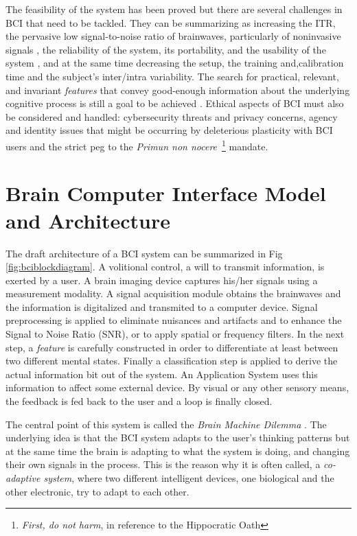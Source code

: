 The feasibility of the system has been proved but there are several challenges in BCI that need to be tackled. They can be summarizing as 
increasing the ITR, the pervasive low signal-to-noise ratio of brainwaves, particularly of noninvasive signals \cite{Lotte2018}, the reliability of the system, its portability, and the usability of the system \cite{Wang2018}, and at the same time decreasing the setup, the training and,calibration time and the subject's inter/intra variability. The search for practical, relevant, and invariant \textit{features} that convey good-enough information about the underlying cognitive process is still a goal to be achieved \cite{Perdikis2014}.  Ethical aspects of BCI \cite{Yuste2017} must also be considered and handled: cybersecurity threats and privacy concerns,  agency and identity issues that might be occurring by deleterious plasticity with BCI users and the strict peg to the \textit{Primun non nocere}~\footnote{\textit{First, do not harm}, in reference to the Hippocratic Oath} mandate.


\section{Brain Computer Interface Model and Architecture}

The draft architecture of a BCI system can be summarized in Fig \ref{fig:bciblockdiagram}.  A volitional control, a will to transmit information, is exerted by a user. A brain imaging device captures his/her signals using a measurement modality.  A signal acquisition module obtains the brainwaves and the information is digitalized and transmited to a computer device.  Signal preprocessing is applied to eliminate nuisances and artifacts and to enhance the Signal to Noise Ratio (SNR), or to apply spatial or frequency filters.  In the next step, a \textit{feature} is carefully constructed in order to differentiate at least between two different mental states.  Finally a classification step is applied to derive the actual information bit out of the system.   An Application System uses this information to affect some external device.  By visual or any other sensory means, the feedback is fed back to the user and a loop is finally closed.

The central point of this system is called the \textit{Brain Machine Dilemma} \cite{WolpawJonathanR2012}.  The underlying idea is that the BCI system adapts to the user's thinking patterns but at the same time the brain is adapting to what the system is doing, and changing their own signals in the process.  This is the reason why it is often called, a \textit{co-adaptive system}, where two different intelligent devices, one biological and the other electronic, try to adapt to each other.

